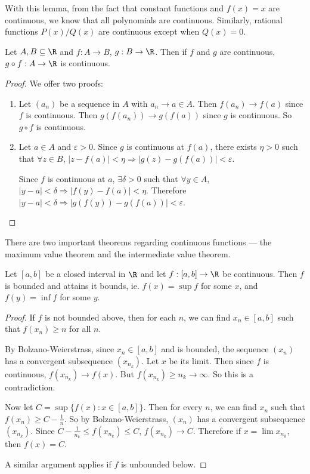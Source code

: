 \documentclass[a4paper]{article}
\begin{document}
With this lemma, from the fact that constant functions and $f(x) = x$ are continuous, we know that all polynomials are continuous. Similarly, rational functions $P(x)/Q(x)$ are continuous except when $Q(x) = 0$.

\begin{lemma}
  Let $A, B\subseteq \R$ and $f: A\to B$, $g: B\to \R$. Then if $f$ and $g$ are continuous, $g\circ f: A\to \R$ is continuous.
\end{lemma}

\begin{proof}
  We offer two proofs:
  \begin{enumerate}
    \item Let $(a_n)$ be a sequence in $A$ with $a_n \to a\in A$. Then $f(a_n) \to f(a)$ since $f$ is continuous. Then $g(f(a_n)) \to g(f(a))$ since $g$ is continuous. So $g\circ f$ is continuous.
    \item Let $a\in A$ and $\varepsilon > 0$. Since $g$ is continuous at $f(a)$, there exists $\eta > 0$ such that $\forall z\in B$, $|z - f(a)| < \eta \Rightarrow |g(z) - g(f(a))| < \varepsilon$.

      Since $f$ is continuous at $a$, $\exists \delta > 0$ such that $\forall y\in A$, $|y - a| < \delta \Rightarrow |f(y) - f(a)| < \eta$. Therefore $|y - a| < \delta \Rightarrow |g(f(y)) - g(f(a))| < \varepsilon$.
  \end{enumerate}
\end{proof}

There are two important theorems regarding continuous functions --- the maximum value theorem and the intermediate value theorem.
\begin{thm}
  Let $[a, b]$ be a closed interval in $\R$ and let $f: [a, b] \to \R$ be continuous. Then $f$ is bounded and attains it bounds, ie. $f(x) = \sup f$ for some $x$, and $f(y) = \inf f$ for some $y$.
\end{thm}

\begin{proof}
  If $f$ is not bounded above, then for each $n$, we can find $x_n\in [a, b]$ such that $f(x_n) \geq n$ for all $n$.

  By Bolzano-Weierstrass, since $x_n \in [a, b]$ and is bounded, the sequence $(x_n)$ has a convergent subsequence $(x_{n_k})$. Let $x$ be its limit. Then since $f$ is continuous, $f(x_{n_k}) \to f(x)$. But $f(x_{n_k}) \geq n_k \to \infty$. So this is a contradiction.

  Now let $C = \sup\{f(x): x\in [a, b]\}$. Then for every $n$, we can find $x_n$ such that $f(x_n) \geq C - \frac{1}{n}$. So by Bolzano-Weierstrass, $(x_n)$ has a convergent subsequence $(x_{n_k})$. Since $C - \frac{1}{n_{k}}\leq f(x_{n_k}) \leq C$, $f(x_{n_k})\to C$. Therefore if $x = \lim x_{n_k}$, then $f(x) = C$.

  A similar argument applies if $f$ is unbounded below.
\end{proof}
\end{document}
